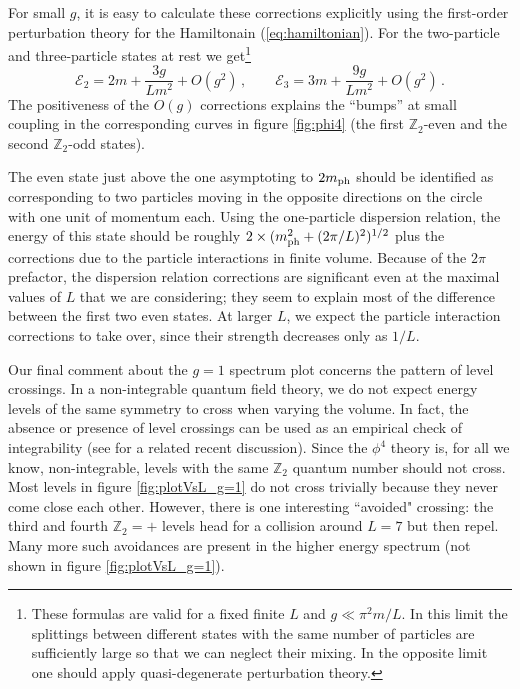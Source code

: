 \documentclass[11pt]{article}
\newcommand{\reef}[1]{(\ref{#1})}
\newcommand{\beq}{\begin{equation}}
\newcommand{\eeq}{\end{equation}}
\def\bZ {\mathbb{Z}}
\def\bZ {\mathbb{Z}}
\def\phys{{\rm ph}}
\numberwithin{equation}{section}
\begin{document}
For small $g$, it is easy to calculate these corrections explicitly using the first-order perturbation theory for the Hamiltonain \reef{eq:hamiltonian}. For the two-particle and three-particle states at rest we get\footnote{These formulas are valid for a fixed finite $L$ and $g\ll \pi^2 m/L$. In this limit the splittings between different states with the same number of particles are sufficiently large so that we can neglect their mixing. In the opposite limit one should apply quasi-degenerate perturbation theory.}  
\beq
\mathcal{E}_2 = 2 m + \frac{3 g}{L m^2}+ O(g^2)\,,\qquad \mathcal{E}_3 = 3 m + \frac{9 g}{L m^2}+ O(g^2)\,.
\eeq
The positiveness of the $O(g)$ corrections explains the ``bumps'' at small coupling in the corresponding curves in figure \ref{fig:phi4} (the first $\bZ_2$-even and the second $\bZ_2$-odd states).
 
The even state just above the one asymptoting to $2m_\phys$ should be identified as corresponding to two particles moving in the opposite directions on the circle with one unit of momentum each. Using the one-particle dispersion relation, the energy of this state should be roughly $2\times (m_\phys^2 + (2 \pi /L)^2)^{1/2}$ plus the corrections due to the particle interactions in finite volume. Because of the $2\pi$ prefactor, the dispersion relation corrections are significant even at the maximal values of $L$ that we are considering; they seem to explain most of the difference between the first two even states. At larger $L$, we expect the particle interaction corrections to take over, since their strength decreases only as $1/L$.

Our final comment about the $g=1$ spectrum plot concerns the pattern of level crossings. In a non-integrable quantum field theory, we do not expect energy levels of the same symmetry to cross when varying the volume. In fact, the absence or presence of level crossings can be used as an empirical check of integrability (see \cite{Brandino:2010sv} for a related recent discussion). Since the $\phi^4$ theory is, for all we know, non-integrable, levels with the same $\bZ_2$ quantum number should not cross. Most levels in figure \ref{fig:plotVsL_g=1} do not cross trivially because they never come close each other. However, there is one interesting ``avoided" crossing: the third and fourth $\bZ_2=+$ levels head for a collision around $L=7$ but then repel. Many more such avoidances are present in the higher energy spectrum (not shown in figure \ref{fig:plotVsL_g=1}). 


\end{document}
